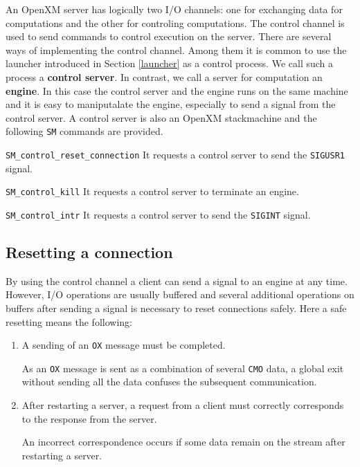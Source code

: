 An OpenXM server has logically two I/O channels: one for exchanging
data for computations and the other for controling computations. The
control channel is used to send commands to control execution on the
server. There are several ways of implementing the control channel.
Among them it is common to use the launcher introduced in Section
\ref{launcher} as a control process. We call such a process a {\bf
control server}. In contrast, we call a server for computation an {\bf
engine}. In this case the control server and the engine runs on the
same machine and it is easy to maniputalate the engine, especially to
send a signal from the control server. A control server is also an
OpenXM stackmachine and the following {\tt SM} commands are provided.

\begin{description}
\item {\tt SM\_control\_reset\_connection}
It requests a control server to send the {\tt SIGUSR1} signal.

\item {\tt SM\_control\_kill}
It requests a control server to terminate an engine.

\item {\tt SM\_control\_intr}
It requests a control server to send the {\tt SIGINT} signal.
\end{description}

\subsection{Resetting a connection}

By using the control channel a client can send a signal to an engine
at any time. However, I/O operations are usually buffered and several
additional operations on buffers after sending a signal is necessary
to reset connections safely. Here a safe resetting means the
following:

\begin{enumerate}
\item A sending of an {\tt OX} message must be completed.

As an {\tt OX} message is sent as a combination of several {\tt CMO}
data, a global exit without sending all the data confuses the
subsequent communication.

\item After restarting a server, a request from a client 
must correctly corresponds to the response from the server.

An incorrect correspondence occurs if some data remain on the stream
after restarting a server.
\end{enumerate}

